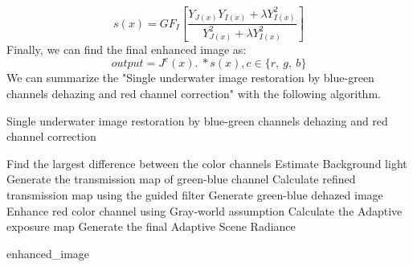\documentclass[a4paper,11pt,oneside]{article}
\begin{document}
 $$s(x)=GF_{I}[\frac{Y_{J(x)}Y_{I(x)}+\lambda Y_{I(x)}^{2}}{Y_{J(x)}^{2}+\lambda Y_{I(x)}^{2}}]$$
 Finally, we can find the final enhanced image as:
 $$output=J^{c}(x).\ *s(x), c\in\{r,\ g,\ b\}$$
 We can summarize the "Single underwater image restoration by blue-green channels dehazing and red channel correction" \cite{26} with the following algorithm.
 \begin{algorithm}
	\caption*{Single underwater image restoration by blue-green channels dehazing and red channel correction \cite{26}}
	\begin{algorithmic}

    \State Find the largest difference between the color channels
    \State Estimate Background light 
    \State Generate the transmission map of green-blue channel
    \State Calculate refined transmission map using the guided filter
    \State Generate green-blue dehazed image
    \State
    \State Enhance red color channel using Gray-world assumption
    \State
    \State Calculate the Adaptive exposure map
    \State Generate the final Adaptive Scene Radiance
    \State
    
    \Return enhanced\_image
\EndProcedure

\end{algorithmic}
\end{algorithm}\\
\end{document}
